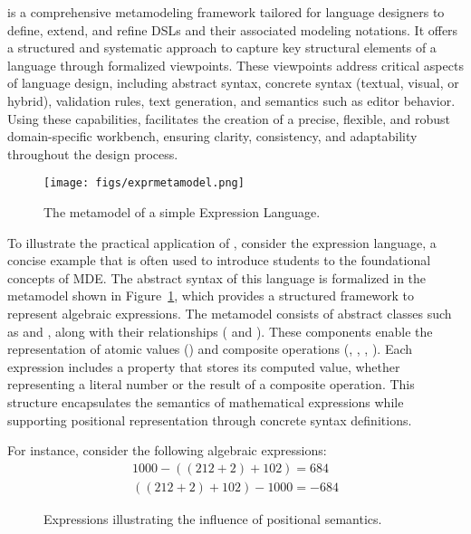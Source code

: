\jjodel{} is a comprehensive metamodeling framework tailored for language designers to define, extend, and refine DSLs and their associated modeling notations. It offers a structured and systematic approach to capture key structural elements of a language through formalized viewpoints. These viewpoints address critical aspects of language design, including abstract syntax, concrete syntax (textual, visual, or hybrid), validation rules, text generation, and semantics such as editor behavior. Using these capabilities, \jjodel{} facilitates the creation of a precise, flexible, and robust domain-specific workbench, ensuring clarity, consistency, and adaptability throughout the design process.

\begin{figure}[ht]
    \centering
    \texttt{[image: figs/exprmetamodel.png]}
    \caption{The metamodel of a simple Expression Language.}
    \label{fig:expr-metamodel}
\end{figure}

To illustrate the practical application of \jjodel{}, consider the expression language, a concise example that is often used to introduce students to the foundational concepts of MDE. The abstract syntax of this language is formalized in the metamodel shown in Figure~\ref{fig:expr-metamodel}, which provides a structured framework to represent algebraic expressions. The metamodel consists of abstract classes such as  and , along with their relationships ( and ). These components enable the representation of atomic values () and composite operations (, , , ). Each expression includes a  property that stores its computed value, whether representing a literal number or the result of a composite operation. This structure encapsulates the semantics of mathematical expressions while supporting positional representation through concrete syntax definitions.

For instance, consider the following algebraic expressions:
\begin{eqnarray}
    1000 - ((212 + 2) + 102) = 684\\
    ((212 + 2) + 102) - 1000 = -684
\end{eqnarray}

\begin{figure}[ht]
    \centering
    \quad
    \caption{Expressions illustrating the influence of positional semantics.}
    \label{fig:expressions}
\end{figure}

